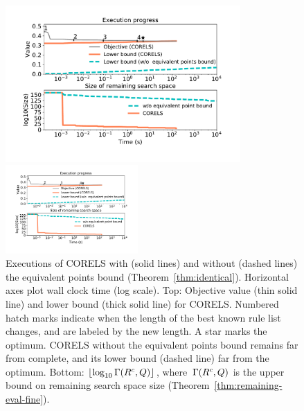 \begin{figure}[t!]
\begin{center}
\begin{arxiv}
\includegraphics[width=0.8\textwidth]{figs/compas_execution-remaining-space.pdf}
\end{arxiv}
\begin{kdd}
\includegraphics[trim={20mm, 25mm, 20mm, 10mm}, width=0.45\textwidth]{figs/compas_execution-remaining-space.pdf}
\end{kdd}
\end{center}
\caption{Executions of CORELS with (solid lines) and without
(dashed lines) the equivalent points bound (Theorem~\ref{thm:identical}).
%
Horizontal axes plot wall clock time (log scale).
%
Top: Objective value (thin solid line) and lower bound (thick solid line) for CORELS.
%
Numbered hatch marks
indicate when the length of the best known rule list changes,
and are labeled by the new length.
%
A star marks the optimum.
%
CORELS without the equivalent points bound remains far from complete,
and its lower bound (dashed line) far from the optimum.
%
Bottom: $\lfloor \log_{10} \Gamma({R^c}, Q) \rfloor$,
where~$\Gamma({R^c}, Q)$
is the upper bound on remaining search space size
(Theorem~\ref{thm:remaining-eval-fine}).
}
\label{fig:objective}
\end{figure}

